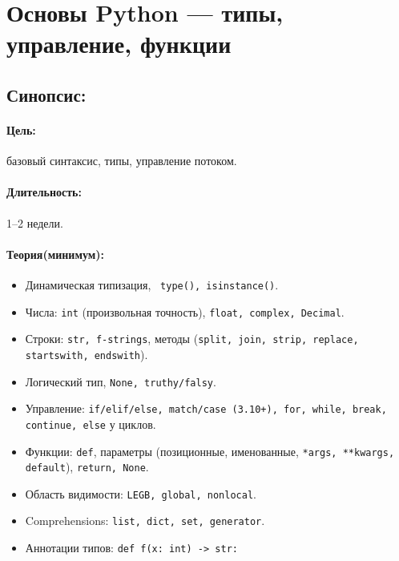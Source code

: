 \section{Основы Python — типы, управление, функции}
\subsection*{Синопсис:}

\paragraph*{Цель:}

базовый синтаксис, типы, управление потоком.

\paragraph*{Длительность:}
 1–2 недели.

\paragraph*{Теория(минимум):}

\begin{itemize}
\item Динамическая типизация, \texttt{ type(), isinstance()}.
\item Числа: \texttt{int} (произвольная точность), \texttt{float, complex, Decimal}.
\item Строки: \texttt{str, f-strings}, методы (\texttt{split, join, strip, replace, startswith, endswith}).
\item Логический тип, \texttt{None, truthy/falsy}.
\item Управление: \texttt{if/elif/else, match/case (3.10+), for, while, break, continue, else} у циклов.
\item Функции: \texttt{def}, параметры (позиционные, именованные, \texttt{*args, **kwargs, default}), \texttt{return, None}.
\item Область видимости: \texttt{LEGB, global, nonlocal}.
\item Comprehensions: \texttt{list, dict, set, generator}.
\item Аннотации типов: \texttt{def f(x: int) -> str:}
\end{itemize}
